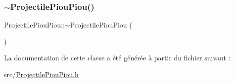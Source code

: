 \subsubsection{\texorpdfstring{$\sim$\+Projectile\+Piou\+Piou()}{~ProjectilePiouPiou()}}
{\footnotesize\ttfamily Projectile\+Piou\+Piou\+::$\sim$\+Projectile\+Piou\+Piou (\begin{DoxyParamCaption}{ }\end{DoxyParamCaption})}



La documentation de cette classe a été générée à partir du fichier suivant \+:\begin{DoxyCompactItemize}
\item 
src/\hyperlink{_projectile_piou_piou_8h}{Projectile\+Piou\+Piou.\+h}\end{DoxyCompactItemize}
